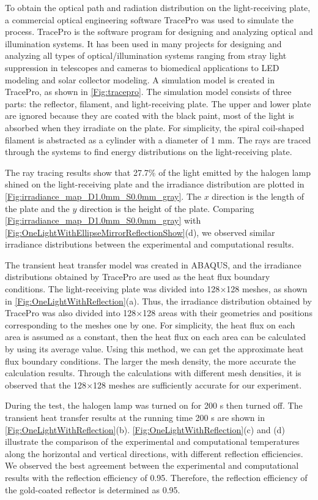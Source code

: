 To obtain the optical path and radiation distribution on the light-receiving plate, a commercial optical engineering software TracePro was used to simulate the process. 
TracePro is the software program for designing and analyzing optical and illumination systems.
It has been used in many projects for designing and analyzing all types of optical/illumination systems ranging from stray light suppression in telescopes and cameras to biomedical applications to LED modeling and solar collector modeling.
A simulation model is created in TracePro, as shown in \ref{Fig:tracepro}.
The simulation model consists of three parts: the reflector, filament, and light-receiving plate.
The upper and lower plate are ignored because they are coated with the black paint, most of the light is absorbed when they irradiate on the plate.
For simplicity, the spiral coil-shaped filament is abstracted as a cylinder with a diameter of 1 mm.
The rays are traced through the systems to find energy distributions on the light-receiving plate.

The ray tracing results show that 27.7\% of the light emitted by the halogen lamp shined on the light-receiving plate and the irradiance distribution are plotted in \ref{Fig:irradiance_map_D1.0mm_S0.0mm_gray}.
The $x$ direction is the length of the plate and the $y$ direction is the height of the plate. Comparing \ref{Fig:irradiance_map_D1.0mm_S0.0mm_gray} with \ref{Fig:OneLightWithEllipseMirrorReflectionShow}(d), we observed similar irradiance distributions between the experimental and computational results.

The transient heat transfer model was created in ABAQUS, and the irradiance distributions obtained by TracePro are used as the heat flux boundary conditions.
The light-receiving plate was divided into 128$\times$128 meshes, as shown in \ref{Fig:OneLightWithReflection}(a). Thus, the irradiance distribution obtained by TracePro was also divided into 128$\times$128 areas with their geometries and positions corresponding to the meshes one by one. For simplicity, the heat flux on each area is assumed as a constant, then the heat flux on each area can be calculated by using its average value. Using this method, we can get the approximate heat flux boundary conditions. The larger the mesh density, the more accurate the calculation results. Through the calculations with different mesh densities, it is observed that the 128$\times$128 meshes are sufficiently accurate for our experiment. 

During the test, the halogen lamp was turned on for 200 s then turned off. The transient heat transfer results at the running time 200 s are shown in \ref{Fig:OneLightWithReflection}(b). \ref{Fig:OneLightWithReflection}(c) and (d) illustrate the comparison of the experimental and computational temperatures along the horizontal and vertical directions, with different reflection efficiencies. We observed the best agreement between the experimental and computational results with the reflection efficiency of 0.95. Therefore, the reflection efficiency of the gold-coated reflector is determined as 0.95.

